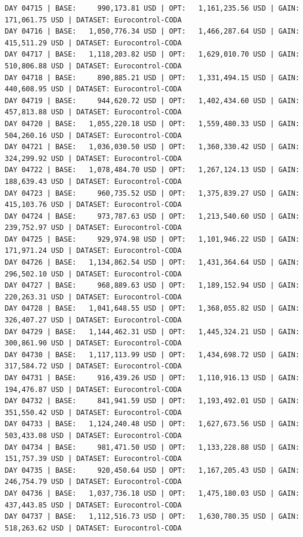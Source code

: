 \documentclass[11pt,a4paper]{article}
\begin{document}
\begin{verbatim}
DAY 04715 | BASE:     990,173.81 USD | OPT:   1,161,235.56 USD | GAIN: 171,061.75 USD | DATASET: Eurocontrol-CODA
DAY 04716 | BASE:   1,050,776.34 USD | OPT:   1,466,287.64 USD | GAIN: 415,511.29 USD | DATASET: Eurocontrol-CODA
DAY 04717 | BASE:   1,118,203.82 USD | OPT:   1,629,010.70 USD | GAIN: 510,806.88 USD | DATASET: Eurocontrol-CODA
DAY 04718 | BASE:     890,885.21 USD | OPT:   1,331,494.15 USD | GAIN: 440,608.95 USD | DATASET: Eurocontrol-CODA
DAY 04719 | BASE:     944,620.72 USD | OPT:   1,402,434.60 USD | GAIN: 457,813.88 USD | DATASET: Eurocontrol-CODA
DAY 04720 | BASE:   1,055,220.18 USD | OPT:   1,559,480.33 USD | GAIN: 504,260.16 USD | DATASET: Eurocontrol-CODA
DAY 04721 | BASE:   1,036,030.50 USD | OPT:   1,360,330.42 USD | GAIN: 324,299.92 USD | DATASET: Eurocontrol-CODA
DAY 04722 | BASE:   1,078,484.70 USD | OPT:   1,267,124.13 USD | GAIN: 188,639.43 USD | DATASET: Eurocontrol-CODA
DAY 04723 | BASE:     960,735.52 USD | OPT:   1,375,839.27 USD | GAIN: 415,103.76 USD | DATASET: Eurocontrol-CODA
DAY 04724 | BASE:     973,787.63 USD | OPT:   1,213,540.60 USD | GAIN: 239,752.97 USD | DATASET: Eurocontrol-CODA
DAY 04725 | BASE:     929,974.98 USD | OPT:   1,101,946.22 USD | GAIN: 171,971.24 USD | DATASET: Eurocontrol-CODA
DAY 04726 | BASE:   1,134,862.54 USD | OPT:   1,431,364.64 USD | GAIN: 296,502.10 USD | DATASET: Eurocontrol-CODA
DAY 04727 | BASE:     968,889.63 USD | OPT:   1,189,152.94 USD | GAIN: 220,263.31 USD | DATASET: Eurocontrol-CODA
DAY 04728 | BASE:   1,041,648.55 USD | OPT:   1,368,055.82 USD | GAIN: 326,407.27 USD | DATASET: Eurocontrol-CODA
DAY 04729 | BASE:   1,144,462.31 USD | OPT:   1,445,324.21 USD | GAIN: 300,861.90 USD | DATASET: Eurocontrol-CODA
DAY 04730 | BASE:   1,117,113.99 USD | OPT:   1,434,698.72 USD | GAIN: 317,584.72 USD | DATASET: Eurocontrol-CODA
DAY 04731 | BASE:     916,439.26 USD | OPT:   1,110,916.13 USD | GAIN: 194,476.87 USD | DATASET: Eurocontrol-CODA
DAY 04732 | BASE:     841,941.59 USD | OPT:   1,193,492.01 USD | GAIN: 351,550.42 USD | DATASET: Eurocontrol-CODA
DAY 04733 | BASE:   1,124,240.48 USD | OPT:   1,627,673.56 USD | GAIN: 503,433.08 USD | DATASET: Eurocontrol-CODA
DAY 04734 | BASE:     981,471.50 USD | OPT:   1,133,228.88 USD | GAIN: 151,757.39 USD | DATASET: Eurocontrol-CODA
DAY 04735 | BASE:     920,450.64 USD | OPT:   1,167,205.43 USD | GAIN: 246,754.79 USD | DATASET: Eurocontrol-CODA
DAY 04736 | BASE:   1,037,736.18 USD | OPT:   1,475,180.03 USD | GAIN: 437,443.85 USD | DATASET: Eurocontrol-CODA
DAY 04737 | BASE:   1,112,516.73 USD | OPT:   1,630,780.35 USD | GAIN: 518,263.62 USD | DATASET: Eurocontrol-CODA

\end{verbatim}
\end{document}
